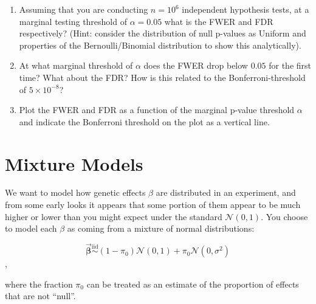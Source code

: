 \documentclass{pset}
\begin{document}
\begin{enumerate}
\item Assuming that you are conducting $n=10^6$ independent hypothesis tests, at a marginal testing threshold of $\alpha = 0.05$ what is the FWER and FDR respectively?  (Hint: consider the distribution of null p-values as Uniform and properties of the Bernoulli/Binomial distribution to show this analytically).

\item At what marginal threshold of $\alpha$ does the FWER drop below $0.05$ for the first time? What about the FDR? How is this related to the Bonferroni-threshold of $5\times 10^{-8}$? 

\item Plot the FWER and FDR as a function of the marginal p-value threshold $\alpha$ and indicate the Bonferroni threshold on the plot as a vertical line.

\end{enumerate}

\newpage 
\section*{Mixture Models}

We want to model how genetic effects $\beta$ are distributed in an experiment, and from some early looks it appears that some portion of them appear to be much higher or lower than you might expect under the standard $\mathcal{N}(0,1)$. You choose to model each $\beta$ as coming from a mixture of normal distributions:

$$\overrightarrow{\mathbf{\beta}} \overset{\text{iid}}{\sim} (1 - \pi_0) \mathcal{N}(0, 1) + \pi_0\mathcal{N}(0,\sigma^2)$$, 

where the fraction $\pi_0$ can be treated as an estimate of the proportion of effects that are not ``null''.
\end{document}
